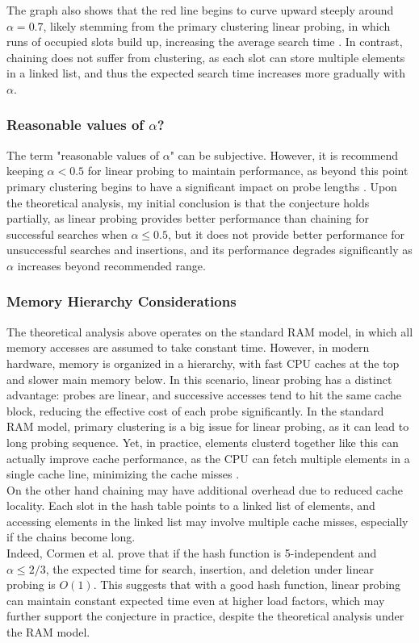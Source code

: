 \documentclass[12pt, a4paper]{article}
\begin{document}
The graph also shows that the red line begins to curve upward steeply around $\alpha = 0.7$, likely stemming from the primary clustering 
linear probing, in which runs of occupied slots build up, increasing the average search time \cite{clrs}. In contrast, chaining does 
not suffer from clustering, as each slot can store multiple elements in a linked list, and thus the expected search time increases more 
gradually with $\alpha$.\\

\subsubsection*{Reasonable values of $\alpha$?}
The term "reasonable values of $\alpha$" can be subjective. 
However, it is recommend keeping $\alpha < 0.5$  for linear probing to maintain performance, as beyond this point 
primary clustering begins to have a significant impact on probe lengths \cite{sedgewick}.
Upon the theoretical analysis, my initial conclusion is that the conjecture holds partially, as
linear probing provides better performance than chaining for successful searches when $\alpha \leq 0.5$, but it does not provide better 
performance for unsuccessful searches and insertions, and its performance degrades significantly as $\alpha$ increases beyond recommended range.
\subsubsection*{Memory Hierarchy Considerations}
The theoretical analysis above operates on the standard RAM model, in which all memory accesses are assumed to take constant time.
However, in modern hardware, memory is organized in a hierarchy, with fast CPU caches at the top and slower main memory below. In this scenario,
linear probing has a distinct advantage: probes are linear, and successive accesses tend to hit the same cache block, reducing the effective 
cost of each probe significantly. In the standard RAM model, primary clustering is a big issue for linear probing, as it can lead to long probing 
sequence. Yet, in practice, elements clusterd together like this can actually improve cache performance, as the CPU can fetch multiple elements in a 
single cache line, minimizing the cache misses \cite{clrs}.\\
\newline
On the other hand chaining may have additional overhead due to reduced cache locality. Each slot in the hash table points to a linked list of elements, 
and accessing elements in the linked list may involve multiple cache misses, especially if the chains become long. \\
\newline
Indeed, Cormen et al. prove that if the hash function is 5-independent and $\alpha \leq 2/3$, the expected time for search, insertion, and deletion under 
linear probing is $O(1)$\cite{clrs}. This suggests that with a good hash function, linear probing 
can maintain constant expected time even at higher load factors, which may further support the conjecture in practice, despite the theoretical analysis under the RAM model.
\end{document}
